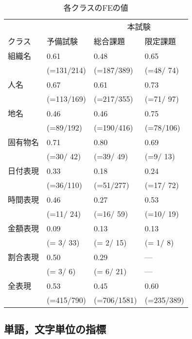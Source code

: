 \begin{table}[t]\small
\caption{\label{table:FE_second}各クラスのFEの値}
\begin{center}
\begin{tabular}{|l||l|l|l|} \hline
         &          & \multicolumn{2}{|c|}{本試験}\\ \cline{3-4}
クラス   & 予備試験 & 総合課題 & 限定課題 \\ \hline \hline
組織名   & 0.61       & 0.48        & 0.65       \\
         & (=131/214) & (=187/389)  & (=48/ 74)  \\ \hline
人名     & 0.67       & 0.61        & 0.73       \\
         & (=113/169) & (=217/355)  & (=71/ 97)  \\ \hline
地名     & 0.46       & 0.46        & 0.75       \\
         & (=89/192)  & (=190/416)  & (=78/106)  \\ \hline
固有物名 & 0.71       & 0.80        & 0.69       \\
         & (=30/ 42)  & (=39/ 49)   & (=9/ 13)   \\ \hline
日付表現 & 0.33       & 0.18        & 0.24       \\
         & (=36/110)  & (=51/277)   & (=17/ 72)  \\ \hline
時間表現 & 0.46       & 0.27        & 0.53       \\
         & (=11/ 24)  & (=16/ 59)   & (=10/ 19)  \\ \hline
金額表現 & 0.09       & 0.13        & 0.13       \\
         & (= 3/ 33)  & (= 2/ 15)   & (= 1/  8)  \\ \hline
割合表現 & 0.50       & 0.29        & ---        \\
         & (= 3/  6)  & (= 6/ 21)   & ---        \\ \hline \hline
全表現   & 0.53       & 0.45        & 0.60       \\ 
         & (=415/790) & (=706/1581) & (=235/389) \\ \hline
\end{tabular}
\end{center}
\end{table}

\subsection{\label{subsec:FW}単語，文字単位の指標}

